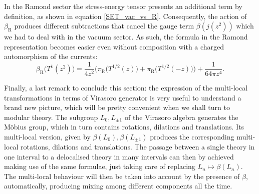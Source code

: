 \bigskip 
In the Ramond sector the stress-energy tensor presents
an additional term by definition, as shown in equation 
\eqref{SET_vac_vs_R}. Consequently, the action of 
$\beta_{\textrm{R}}$ produces different subtractions 
that cancel the gauge term $\beta(j(z^2))$ which we 
had to deal with in the vacuum sector. 
As such, the formula in the Ramond representation 
becomes easier even without composition with a charged
automorphism of the currents:
\[
\beta_{\textrm{R}}\big(T^1(z^2)\big)=
\frac{1}{4z^2}\Big(\pi_{\textrm{R}}\big(T^{1/2}(z)\big)
+\pi_{\textrm{R}}\big(T^{1/2}(-z)\big)\Big)+
\frac{1}{64 \pi z^4}.
\]

\bigskip 
Finally, a last remark to conclude this section:
the expression of the multi-local 
transformations in terms of Virasoro generator is 
very useful to understand a brand new picture, which
will be pretty convenient when we shall turn to modular
theory. The subgroup $L_0,L_{\pm 1}$ of the Virasoro 
algebra generates the M\"obius group, which in turn
contains rotations, dilations and translations. Its 
multi-local version, given by $\beta(L_0),\beta(L_{\pm 1})$
produces the corresponding multi-local rotations,
dilations and translations. The passage between a single
theory in one interval to a delocalised theory in many
intervals can then by achieved making use of
the same formulae, just taking care of replacing
$L_n\mapsto \beta(L_n)$. The multi-local behaviour
will then be taken into account by the presence of 
$\beta$, automatically, producing mixing among different
components all the time.















